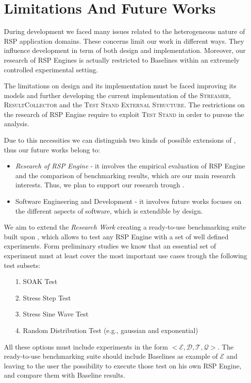 \section{Limitations And Future Works}

During \name development we faced many issues related to the heterogeneous nature of RSP application domains. These concerns limit our work in different ways. They influence  \name development in term of both design and implementation. Moreover, our research of RSP Engines  is actually restricted to \name Baselines within an extremely controlled experimental setting.

The limitations on \name design and its implementation must be faced improving its models and further developing the current implementation of the \textsc{Streamer}, \textsc{ResultCollector} and the \textsc{Test Stand External Structure}. The restrictions on the research of RSP Engine require to exploit \name \textsc{Test Stand} in order to pursue the analysis.

Due to this necessities we can distinguish two kinds of possible extensions of \namens, thus our future works belong to:
\begin{itemize}
\item \textit{Research of RSP Engine} - it involves the empirical evaluation of RSP Engine and the comparison of benchmarking results, which are our main research interests. Thus, we plan to support our research trough \namens.
\item Software Engineering and Development - it involves future works focuses on the different aspects of \name software, which is extendible by design.
\end{itemize}

\noindent We aim to extend the \textit{Research Work} creating a ready-to-use benchmarking suite built upon \namens, which allows to test any RSP Engine with a set of well defined experiments. Form preliminary studies we know that an essential set of experiment must at least cover the most important use cases trough the following test subsets:
\begin{itemize}
\item[1.] SOAK Test
\item[2.] Stress Step Test
\item[3.] Stress Sine Wave Test
\item[4.] Random Distribution Test (e.g., gaussian and exponential)
\end{itemize}
All these options must include experiments  in the form $<\mathcal{E},\mathcal{D},\mathcal{T},\mathcal{Q}>$. The ready-to-use benchmarking suite should include \name Baselines as example of $\mathcal{E}$ and leaving to the user the possibility to execute those test on his own RSP Engine, and compare them with Baseline results.


